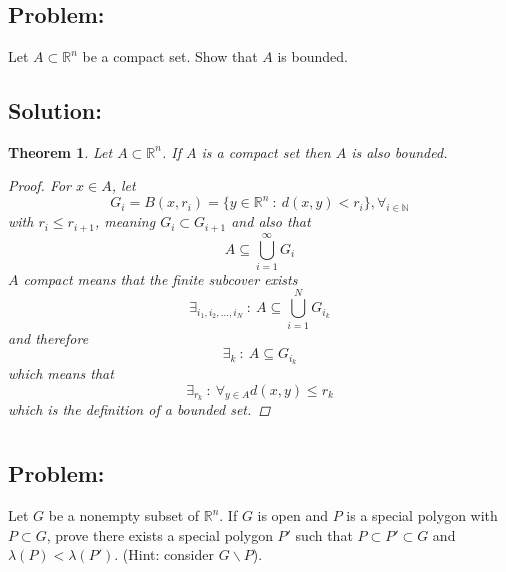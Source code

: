 \documentclass[]{article}
\newcommand{\R}{\mathbb{R}}
\newcommand{\N}{\mathbb{N}}
\newcommand{\st}{\ : \ }
\newtheorem{theorem}{Theorem}
\begin{document}
\section{}
\subsection*{Problem:}
Let $A \subset \R^n$ be a compact set. 
Show that $A$ is bounded. 

\subsection*{Solution:}
\begin{theorem}
    Let $A \subset \R^n$. 
    If $A$ is a compact set then $A$ is also bounded.
    \begin{proof}
        For $x \in A$, let \[
            G_{i} = B(x,r_i) = \{
                y \in \R^n \st d(x,y) < r_{i}
            \}, \forall_{i \in \N}
        \] with $r_i \leq r_{i+1}$, meaning $G_i \subset G_{i+1}$ and also that \[
            A \subseteq \bigcup_{i=1}^{\infty} G_i
        \] $A$ compact means that the finite subcover exists \[
            \exists_{i_1,i_2,\dots,i_N} \st A \subseteq \bigcup_{i=1}^{N} G_{i_k}
        \] and therefore \[
            \exists_k \st A \subseteq G_{i_k}
        \] which means that \[
            \exists_{r_k} \st \forall_{y \in A} d(x,y) \leq r_k
        \] which is the definition of a bounded set.
    \end{proof}
\end{theorem}

\newpage
\section{}
\subsection*{Problem:}
Let $G$ be a nonempty subset of $\R^n$. 
If $G$ is open and $P$ is a special polygon with $P\subset G$, prove there exists a special polygon $P'$ such that $P \subset P' \subset G$ and $\lambda(P) < \lambda(P')$. 
(Hint: consider $G \backslash P$).
\end{document}
